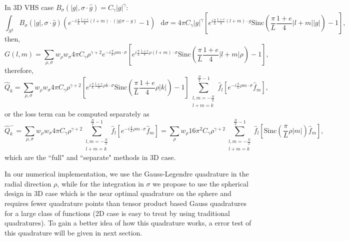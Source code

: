 \documentclass[review, times]{elsarticle}
\newcommand*\diff{\mathop{}\!\mathrm{d}}
\begin{document}
In 3D VHS case $B_{\sigma}(|g|,\sigma\cdot \hat{g})=C_{\gamma}|g|^{\gamma}$:
\begin{equation}
\int_{S^2}B_{\sigma}(|g|,\sigma\cdot \hat{g})\left(e^{-i\frac{\pi}{L}\frac{1+e}{4}(l+m)\cdot (|g|\sigma-g)}-1\right)\,\diff{\sigma}=4\pi C_{\gamma}|g|^{\gamma}\left[ e^{i\frac{\pi}{L}\frac{1+e}{4}(l+m)\cdot g}\text{Sinc}\left(\frac{\pi}{L}\frac{1+e}{4}|l+m||g|\right)-1\right],
\end{equation}
then,
\begin{equation}
G(l,m)=\sum_{\rho,\sigma}w_{\rho}w_{\sigma}4\pi C_{\gamma}\rho^{\gamma+2}e^{-i\frac{\pi}{L}\rho m \cdot \sigma}\left[ e^{i\frac{\pi}{L}\frac{1+e}{4}\rho (l+m)\cdot \sigma}\text{Sinc}\left(\frac{\pi}{L}\frac{1+e}{4}|l+m|\rho\right)-1\right],
\end{equation}
therefore,
\begin{equation} 
\hat{Q}_k=\sum_{\rho,\sigma}w_{\rho}w_{\sigma}4\pi C_{\gamma}\rho^{\gamma+2}\left[ e^{i\frac{\pi}{L}\frac{1+e}{4}\rho k\cdot \sigma}\text{Sinc}\left(\frac{\pi}{L}\frac{1+e}{4}\rho |k|\right)-1\right]\sum_{\substack{l,m=-\frac{N}{2}\\l+m=k}}^{\frac{N}{2}-1}\hat{f}_l \left[e^{-i\frac{\pi}{L}\rho m \cdot \sigma}\hat{f}_m\right],
\end{equation} 
or the loss term can be computed separately as
\begin{equation} 
\hat{Q}_k^-=\sum_{\rho,\sigma}w_{\rho}w_{\sigma}4\pi C_{\gamma}\rho^{\gamma+2}\sum_{\substack{l,m=-\frac{N}{2}\\l+m=k}}^{\frac{N}{2}-1}\hat{f}_l \left[e^{-i\frac{\pi}{L}\rho m \cdot \sigma}\hat{f}_m\right]=\sum_{\rho}w_{\rho}16\pi^2 C_{\gamma}\rho^{\gamma+2}\sum_{\substack{l,m=-\frac{N}{2}\\l+m=k}}^{\frac{N}{2}-1}\hat{f}_l \left[\text{Sinc}\left(\frac{\pi}{L}\rho |m|\right)\hat{f}_m\right],
\end{equation}
which are the ``full" and ``separate" methods in 3D case.

\begin{rmk}
	In our numerical implementation, we use the Gauss-Legendre quadrature in the radial direction $\rho$, while for the integration in $\sigma$ we propose to use the spherical design in 3D case which is the near optimal quadrature on the sphere and requires fewer quadrature points than tensor product based Gauss quadratures for a large class of functions (2D case is easy to treat by using traditional quadratures). To gain a better idea of how this quadrature works, a error test of this quadrature will be given in next section.
\end{rmk}
\end{document}
